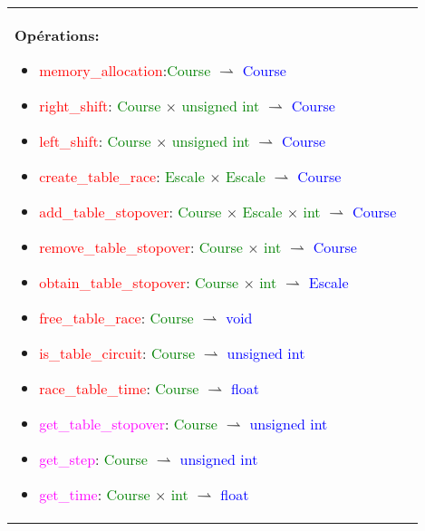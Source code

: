 \documentclass[a4paper, 11pt, oneside]{article}
\begin{document}
\begin{tabular}{|p{17cm}|c}
				\textbf{Opérations\footnotemark{}:}
					\begin{itemize}
						\item[] \textcolor{red}{memory\_allocation}:\textcolor{green}{Course} $\rightharpoonup$ \textcolor{blue}{Course}
						\item[] \textcolor{red}{right\_shift}: \textcolor{green}{Course} $\times$ \textcolor{green}{unsigned int} $\rightharpoonup$ \textcolor{blue}{Course}
						\item[] \textcolor{red}{left\_shift}: \textcolor{green}{Course} $\times$ \textcolor{green}{unsigned int} $\rightharpoonup$ \textcolor{blue}{Course}
						\item[] \textcolor{red}{create\_table\_race}: \textcolor{green}{Escale} $\times$ \textcolor{green}{Escale} $\rightharpoonup$ \textcolor{blue}{Course}
						\item[] \textcolor{red}{add\_table\_stopover}: \textcolor{green}{Course} $\times$ \textcolor{green}{Escale} $\times$ \textcolor{green}{int} $\rightharpoonup$ \textcolor{blue}{Course}
						\item[] \textcolor{red}{remove\_table\_stopover}: \textcolor{green}{Course} $\times$ \textcolor{green}{int} $\rightharpoonup$ \textcolor{blue}{Course}
						\item[] \textcolor{red}{obtain\_table\_stopover}: \textcolor{green}{Course} $\times$ \textcolor{green}{int} $\rightharpoonup$ \textcolor{blue}{Escale}
						\item[] \textcolor{red}{free\_table\_race}: \textcolor{green}{Course} $\rightharpoonup$ \textcolor{blue}{void}
						\item[] \textcolor{red}{is\_table\_circuit}: \textcolor{green}{Course} $\rightharpoonup$ \textcolor{blue}{unsigned int}
						\item[] \textcolor{red}{race\_table\_time}: \textcolor{green}{Course} $\rightharpoonup$ \textcolor{blue}{float}
						\item[] \textcolor{magenta}{get\_table\_stopover}: \textcolor{green}{Course} $\rightharpoonup$ \textcolor{blue}{unsigned int}
						\item[] \textcolor{magenta}{get\_step}: \textcolor{green}{Course} $\rightharpoonup$ \textcolor{blue}{unsigned int}
						\item[] \textcolor{magenta}{get\_time}: \textcolor{green}{Course} $\times$ \textcolor{green}{int} $\rightharpoonup$ \textcolor{blue}{float}
					\end{itemize}


\end{tabular}
\end{document}
